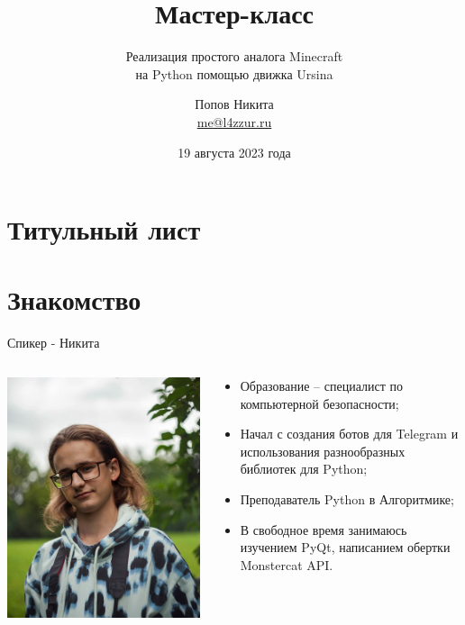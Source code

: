 \documentclass[handout]{beamer}
\title{Мастер-класс}
\subtitle{Реализация простого аналога Minecraft\\на Python помощью движка Ursina}
\author{Попов Никита \\ \href{mailto:me@l4zzur.ru}{me@l4zzur.ru}}
\institute{Международная школа программирования и математики Алгоритмика}
\date{19 августа 2023 года}
\begin{document}
    \section{Титульный лист}
    \begin{frame}
        \titlepage
    \end{frame}

    \section{Знакомство}
    \begin{frame}{Спикер - Никита}
        \begin{columns}
            \begin{column}{0.4\textwidth}
                \includegraphics[width=\textwidth]{img/me.png}
            \end{column}
            \begin{column}{0.6\textwidth}
                \begin{itemize}
                    \item Образование – специалист по компьютерной безопасности;
                    \item Начал с создания ботов для Telegram и использования разнообразных библиотек для Python;
                    \item Преподаватель Python в Алгоритмике;
                    \item В свободное время занимаюсь изучением PyQt, написанием обертки Monstercat API.
                \end{itemize}
            \end{column}
        \end{columns}
    \end{frame}
\end{document}
